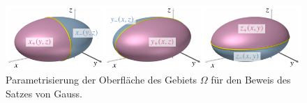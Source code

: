 %
%
%
\begin{figure}
\centering
\includegraphics[width=\textwidth]{chapters/040-felder/images/gauss.pdf}
\caption{Parametrisierung der Oberfläche des Gebiets $\Omega$ für
den Beweis des Satzes von Gauss.
\label{buch:felder:fundamentallemma:fig:gauss}}
\end{figure}
